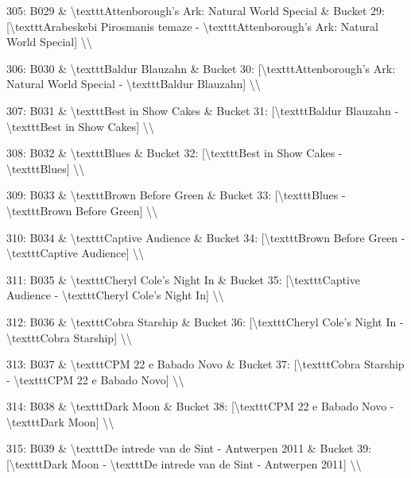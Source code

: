 \documentclass[11pt,a4paper]{article}
\begin{document}
{305: B029 \& \textbackslash{}texttt{Attenborough's Ark: Natural World Special} \& Bucket 29: [\textbackslash{}texttt{Arabeskebi Pirosmanis temaze} - \textbackslash{}texttt{Attenborough's Ark: Natural World Special}] \textbackslash{}\textbackslash{}

306: B030 \& \textbackslash{}texttt{Baldur Blauzahn} \& Bucket 30: [\textbackslash{}texttt{Attenborough's Ark: Natural World Special} - \textbackslash{}texttt{Baldur Blauzahn}] \textbackslash{}\textbackslash{}

307: B031 \& \textbackslash{}texttt{Best in Show Cakes} \& Bucket 31: [\textbackslash{}texttt{Baldur Blauzahn} - \textbackslash{}texttt{Best in Show Cakes}] \textbackslash{}\textbackslash{}

308: B032 \& \textbackslash{}texttt{Blues} \& Bucket 32: [\textbackslash{}texttt{Best in Show Cakes} - \textbackslash{}texttt{Blues}] \textbackslash{}\textbackslash{}

309: B033 \& \textbackslash{}texttt{Brown Before Green} \& Bucket 33: [\textbackslash{}texttt{Blues} - \textbackslash{}texttt{Brown Before Green}] \textbackslash{}\textbackslash{}

310: B034 \& \textbackslash{}texttt{Captive Audience} \& Bucket 34: [\textbackslash{}texttt{Brown Before Green} - \textbackslash{}texttt{Captive Audience}] \textbackslash{}\textbackslash{}

311: B035 \& \textbackslash{}texttt{Cheryl Cole's Night In} \& Bucket 35: [\textbackslash{}texttt{Captive Audience} - \textbackslash{}texttt{Cheryl Cole's Night In}] \textbackslash{}\textbackslash{}

312: B036 \& \textbackslash{}texttt{Cobra Starship} \& Bucket 36: [\textbackslash{}texttt{Cheryl Cole's Night In} - \textbackslash{}texttt{Cobra Starship}] \textbackslash{}\textbackslash{}

313: B037 \& \textbackslash{}texttt{CPM 22 e Babado Novo} \& Bucket 37: [\textbackslash{}texttt{Cobra Starship} - \textbackslash{}texttt{CPM 22 e Babado Novo}] \textbackslash{}\textbackslash{}

314: B038 \& \textbackslash{}texttt{Dark Moon} \& Bucket 38: [\textbackslash{}texttt{CPM 22 e Babado Novo} - \textbackslash{}texttt{Dark Moon}] \textbackslash{}\textbackslash{}

315: B039 \& \textbackslash{}texttt{De intrede van de Sint - Antwerpen 2011} \& Bucket 39: [\textbackslash{}texttt{Dark Moon} - \textbackslash{}texttt{De intrede van de Sint - Antwerpen 2011}] \textbackslash{}\textbackslash{}

}
\end{document}
